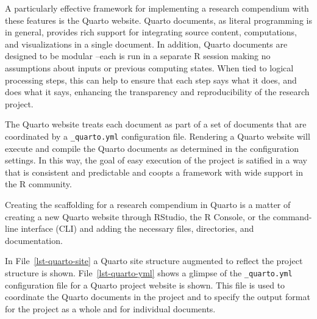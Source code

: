 \documentclass[
  letterpaper,
]{latex/krantz}
\theoremstyle{definition}
\theoremstyle{remark}
\begin{document}
A particularly effective framework for implementing a research
compendium with these features is the Quarto website. Quarto documents,
as literal programming is in general, provides rich support for
integrating source content, computations, and visualizations in a single
document. In addition, Quarto documents are designed to be modular
--each is run in a separate R session making no assumptions about inputs
or previous computing states. When tied to logical processing steps,
this can help to ensure that each step says what it does, and does what
it says, enhancing the transparency and reproducibility of the research
project.

The Quarto website treats each document as part of a set of documents
that are coordinated by a \texttt{\_quarto.yml} configuration file.
Rendering a Quarto website will execute and compile the Quarto documents
as determined in the configuration settings. In this way, the goal of
easy execution of the project is satified in a way that is consistent
and predictable and coopts a framework with wide support in the R
community.

Creating the scaffolding for a research compendium in Quarto is a matter
of creating a new Quarto website through RStudio, the R Console, or the
command-line interface (CLI) and adding the necessary files,
directories, and documentation.

In File~\ref{lst-quarto-site} a Quarto site structure augmented to
reflect the project structure is shown. File~\ref{lst-quarto-yml} shows
a glimpse of the \texttt{\_quarto.yml} configuration file for a Quarto
project website is shown. This file is used to coordinate the Quarto
documents in the project and to specify the output format for the
project as a whole and for individual documents.
\end{document}
